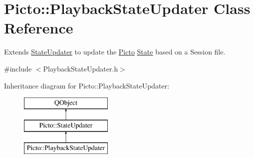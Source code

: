 \hypertarget{class_picto_1_1_playback_state_updater}{\section{Picto\-:\-:Playback\-State\-Updater Class Reference}
\label{class_picto_1_1_playback_state_updater}
}


Extends \hyperlink{class_picto_1_1_state_updater}{State\-Updater} to update the \hyperlink{namespace_picto}{Picto} \hyperlink{class_picto_1_1_state}{State} based on a Session file.  




{\ttfamily \#include $<$Playback\-State\-Updater.\-h$>$}

Inheritance diagram for Picto\-:\-:Playback\-State\-Updater\-:\begin{figure}[H]
\begin{center}
\leavevmode
\includegraphics[height=3.000000cm]{class_picto_1_1_playback_state_updater}
\end{center}
\end{figure}
